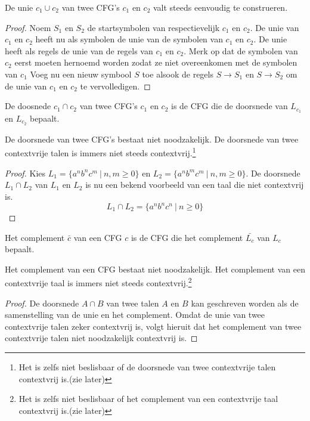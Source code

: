\documentclass[main.tex]{subfiles}
\begin{document}
\begin{st}
  \label{st:unie-cfgs-bestaat-altijd}
  De unie $c_{1} \cup c_{2}$ van twee CFG's $c_{1}$ en $c_{2}$ valt steeds eenvoudig te construeren.
  
  \begin{proof}
    Noem $S_{1}$ en $S_{2}$ de startsymbolen van respectievelijk $c_{1}$ en $c_{2}$.
    De unie van $c_{1}$ en $c_{2}$ heeft nu als symbolen de unie van de symbolen van $c_{1}$ en $c_{2}$.
    De unie heeft als regels de unie van de regels van $c_{1}$ en $c_{2}$.
    Merk op dat de symbolen van $c_{2}$ eerst moeten hernoemd worden zodat ze niet overeenkomen met de symbolen van $c_{1}$
    Voeg nu een nieuw symbool $S$ toe alsook de regels $S\rightarrow S_{1}$ en $S\rightarrow S_{2}$ om de unie van $c_{1}$ en $c_{2}$ te vervolledigen.
  \end{proof}
\end{st}

\begin{de}
  De doosnede $c_{1} \cap c_{2}$ van twee CFG's $c_{1}$ en $c_{2}$ is de CFG die de doorsnede van $L_{c_{1}}$ en $L_{c_{2}}$ bepaalt.
\end{de}

\begin{tvb}
  \label{tvb:doorsnede-cfl-niet-altijd-cfl}
  De doorsnede van twee CFG's bestaat niet noodzakelijk.
  De doorsnede van twee contextvrije talen is immers niet steeds contextvrij.\footnote{Het is zelfs niet beslisbaar of de doorsnede van twee contextvrije talen contextvrij is.(zie later)}

  \begin{proof}
    Kies $L_{1} = \{ a^{n}b^{n}c^{m} \ |\ n,m \ge 0 \}$ en $L_{2} = \{ a^{n}b^{m}c^{m} \ |\ n,m \ge 0 \}$.
    De doorsnede $L_{1} \cap L_{2}$ van $L_{1}$ en $L_{2}$ is nu een bekend voorbeeld van een taal die niet contextvrij is.
    \[ L_{1} \cap L_{2} = \{ a^{n}b^{n}c^{n} \ |\ n \ge 0 \} \]
  \end{proof}
\end{tvb}

\begin{de}
  Het complement $\bar{c}$ van een CFG $c$ is de CFG die het complement $\bar{L_{c}}$ van $L_{c}$ bepaalt.
\end{de}

\begin{st}
  Het complement van een CFG bestaat niet noodzakelijk.
  Het complement van een contextvrije taal is immers niet steeds contextvrij.\footnote{Het is zelfs niet beslisbaar of het complement van een contextvrije taal contextvrij is.(zie later)}

  \begin{proof}
    De doorsnede $A \cap B$ van twee talen $A$ en $B$ kan geschreven worden als de samenstelling van de unie en het complement.
    Omdat de unie van twee contextvrije talen zeker contextvrij is, volgt hieruit dat het complement van twee contextvrije talen niet noodzakelijk contextvrij is.
  \end{proof}
\end{st}
\end{document}
